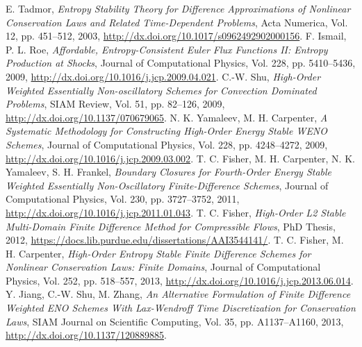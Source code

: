 \documentclass{scrartcl}
\begin{document}

\begin{thebibliography}{9}
    E. Tadmor,
    \textit{
        Entropy Stability Theory for Difference Approximations of Nonlinear
        Conservation Laws and Related Time-Dependent Problems},
    Acta Numerica, Vol. 12, pp. 451--512, 2003,
    \url{http://dx.doi.org/10.1017/s0962492902000156}.
    F. Ismail, P. L. Roe,
    \textit{
        Affordable, Entropy-Consistent {Euler} Flux Functions II: Entropy
        Production at Shocks},
    Journal of Computational Physics, Vol. 228, pp. 5410--5436, 2009,
    \url{http://dx.doi.org/10.1016/j.jcp.2009.04.021}.
    C.-W. Shu,
    \textit{
        High-Order Weighted Essentially Non-oscillatory Schemes for Convection
        Dominated Problems},
    {SIAM} Review, Vol. 51, pp. 82--126, 2009,
    \url{http://dx.doi.org/10.1137/070679065}.
    N. K. Yamaleev, M. H. Carpenter,
    \textit{A Systematic Methodology for Constructing High-Order Energy Stable {WENO} Schemes},
    Journal of Computational Physics, Vol. 228, pp. 4248--4272, 2009,
    \url{http://dx.doi.org/10.1016/j.jcp.2009.03.002}.
    T. C. Fisher, M. H. Carpenter, N. K. Yamaleev, S. H. Frankel,
    \textit{
        Boundary Closures for Fourth-Order Energy Stable Weighted Essentially
        Non-Oscillatory Finite-Difference Schemes},
    Journal of Computational Physics, Vol. 230, pp. 3727--3752, 2011,
    \url{http://dx.doi.org/10.1016/j.jcp.2011.01.043}.
    T. C. Fisher,
    \textit{
        High-Order L2 Stable Multi-Domain Finite Difference Method for
        Compressible Flows},
    PhD Thesis, 2012,
    \url{https://docs.lib.purdue.edu/dissertations/AAI3544141/}.
    T. C. Fisher, M. H. Carpenter,
    \textit{
        High-Order Entropy Stable Finite Difference Schemes for Nonlinear
        Conservation Laws: Finite Domains},
    Journal of Computational Physics, Vol. 252, pp. 518--557, 2013,
    \url{http://dx.doi.org/10.1016/j.jcp.2013.06.014}.
    Y. Jiang, C.-W. Shu, M. Zhang,
    \textit{
        An Alternative Formulation of Finite Difference Weighted ENO Schemes
        With Lax-Wendroff Time Discretization for Conservation Laws},
    {SIAM} Journal on Scientific Computing, Vol. 35, pp. A1137--A1160, 2013,
    \url{http://dx.doi.org/10.1137/120889885}.
\end{thebibliography}
\end{document}
